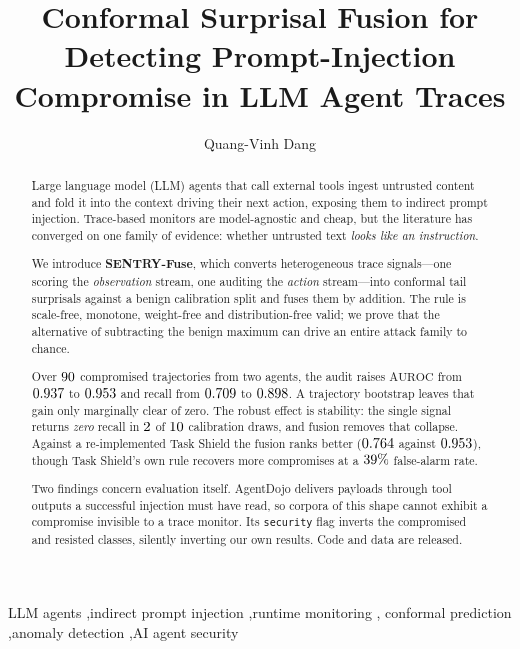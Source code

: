 \documentclass[preprint,12pt,number]{elsarticle}
\theoremstyle{definition}
\begin{document}
\begin{frontmatter}

\title{Conformal Surprisal Fusion for Detecting Prompt-Injection
Compromise in LLM Agent Traces}

\author[buv]{Quang-Vinh Dang}

\begin{abstract}
Large language model (LLM) agents that call external tools ingest untrusted
content and fold it into the context driving their next action, exposing them to
indirect prompt injection. Trace-based monitors are model-agnostic and cheap, but the
literature has converged on one family of evidence: whether untrusted text
\emph{looks like an instruction}.

We introduce \textbf{SENTRY-Fuse}, which converts heterogeneous trace
signals---one scoring the \emph{observation} stream, one auditing the
\emph{action} stream---into conformal tail surprisals against a benign
calibration split and fuses them by addition. The rule is scale-free, monotone,
weight-free and distribution-free valid; we prove that the alternative of
subtracting the benign maximum can drive an entire attack family to chance.

Over $90$ compromised trajectories from two agents, the audit raises
$\mathrm{AUROC}$ from $0.937$ to $0.953$ and recall from
$0.709$ to $0.898$. A trajectory bootstrap leaves that gain only
marginally clear of zero. The robust effect is stability: the single signal returns \emph{zero} recall in $2$ of
$10$ calibration draws, and fusion removes that collapse. Against a
re-implemented Task Shield the fusion ranks better ($0.764$ against
$0.953$), though Task Shield's own rule recovers more compromises at a
$39\%$ false-alarm rate.

Two findings concern evaluation itself. AgentDojo delivers payloads through tool
outputs a successful injection must have read, so corpora of this shape cannot
exhibit a compromise invisible to a trace monitor. Its \texttt{security} flag
inverts the compromised and resisted classes, silently inverting our own results.
Code and data are released.
\end{abstract}

\begin{keyword}
LLM agents \sep indirect prompt injection \sep runtime monitoring \sep
conformal prediction \sep anomaly detection \sep AI agent security
\end{keyword}

\end{frontmatter}
\end{document}
